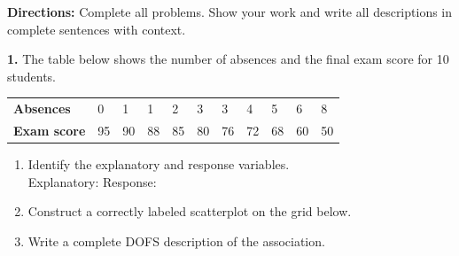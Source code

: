 \documentclass[10pt]{article}
\begin{document}
\namedateperiod

\vspace{0.18in}

\noindent\textbf{Directions:} Complete all problems. Show your work and write all
descriptions in complete sentences with context.

\vspace{0.14in}

\noindent\textbf{1.} The table below shows the number of absences and the final exam score
for 10 students.

\vspace{8pt}
\renewcommand{\arraystretch}{1.4}
\begin{tabularx}{\linewidth}{@{} l *{10}{C{0.9cm}} @{}}
\textbf{Absences} & 0 & 1 & 1 & 2 & 3 & 3 & 4 & 5 & 6 & 8 \\
\textbf{Exam score} & 95 & 90 & 88 & 85 & 80 & 76 & 72 & 68 & 60 & 50 \\
\end{tabularx}

\vspace{10pt}

\begin{enumerate}[label=\textbf{(\alph*)}, leftmargin=2em, itemsep=0.2in]

  \item Identify the explanatory and response variables.\\[8pt]
        Explanatory: \blank{5.5cm} \quad Response: \blank{5.5cm}

  \item Construct a correctly labeled scatterplot on the grid below.

        \vspace{6pt}
        \begin{center}
        \end{center}

  \item Write a complete DOFS description of the association.\\[8pt]
        \writeline\\[3pt]\writeline\\[3pt]\writeline\\[3pt]\writeline

\end{enumerate}
\end{document}
